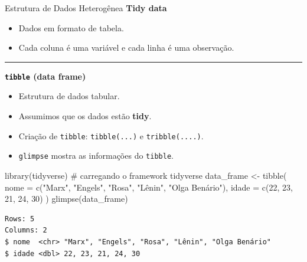 \documentclass[
  10pt,
  ignorenonframetext,
]{beamer}
\newenvironment{Shaded}{\begin{snugshade}}{\end{snugshade}}
\newcommand{\AttributeTok}[1]{\textcolor[rgb]{0.40,0.45,0.13}{#1}}
\newcommand{\CommentTok}[1]{\textcolor[rgb]{0.37,0.37,0.37}{#1}}
\newcommand{\DecValTok}[1]{\textcolor[rgb]{0.68,0.00,0.00}{#1}}
\newcommand{\FunctionTok}[1]{\textcolor[rgb]{0.28,0.35,0.67}{#1}}
\newcommand{\NormalTok}[1]{\textcolor[rgb]{0.00,0.23,0.31}{#1}}
\newcommand{\OtherTok}[1]{\textcolor[rgb]{0.00,0.23,0.31}{#1}}
\newcommand{\StringTok}[1]{\textcolor[rgb]{0.13,0.47,0.30}{#1}}
\providecommand{\tightlist}{%
  \setlength{\itemsep}{0pt}\setlength{\parskip}{0pt}}\usepackage{longtable,booktabs,array}
\newcommand*{\regrafina}{\rule{\textwidth}{0.5pt}}
\begin{document}
\begin{frame}[fragile]{Estrutura de Dados Heterogênea}
\protect\hypertarget{estrutura-de-dados-heteroguxeanea-1}{}
\textbf{Tidy data}

\begin{itemize}
\tightlist
\item
  Dados em formato de tabela.
\item
  Cada coluna é uma variável e cada linha é uma observação.
\end{itemize}

\regrafina

\textbf{\texttt{tibble} (data frame)}

\begin{itemize}
\tightlist
\item
  Estrutura de dados tabular.
\item
  Assumimos que os dados estão \textbf{tidy}.
\item
  Criação de \texttt{tibble}: \texttt{tibble(...)} e
  \texttt{tribble(....)}.
\item
  \texttt{glimpse} mostra as informações do \texttt{tibble}.
\end{itemize}
\end{frame}

\begin{frame}[fragile]
\begin{Shaded}
\begin{Highlighting}[]
\FunctionTok{library}\NormalTok{(tidyverse) }\CommentTok{\# carregando o framework tidyverse}
\NormalTok{data\_frame }\OtherTok{\textless{}{-}} \FunctionTok{tibble}\NormalTok{(}
  \AttributeTok{nome =} \FunctionTok{c}\NormalTok{(}\StringTok{"Marx"}\NormalTok{, }\StringTok{"Engels"}\NormalTok{, }\StringTok{"Rosa"}\NormalTok{, }\StringTok{"Lênin"}\NormalTok{, }\StringTok{"Olga Benário"}\NormalTok{),}
  \AttributeTok{idade =} \FunctionTok{c}\NormalTok{(}\DecValTok{22}\NormalTok{, }\DecValTok{23}\NormalTok{, }\DecValTok{21}\NormalTok{, }\DecValTok{24}\NormalTok{, }\DecValTok{30}\NormalTok{)}
\NormalTok{)}
\FunctionTok{glimpse}\NormalTok{(data\_frame)}
\end{Highlighting}
\end{Shaded}

\begin{verbatim}
Rows: 5
Columns: 2
$ nome  <chr> "Marx", "Engels", "Rosa", "Lênin", "Olga Benário"
$ idade <dbl> 22, 23, 21, 24, 30
\end{verbatim}
\end{frame}
\end{document}
